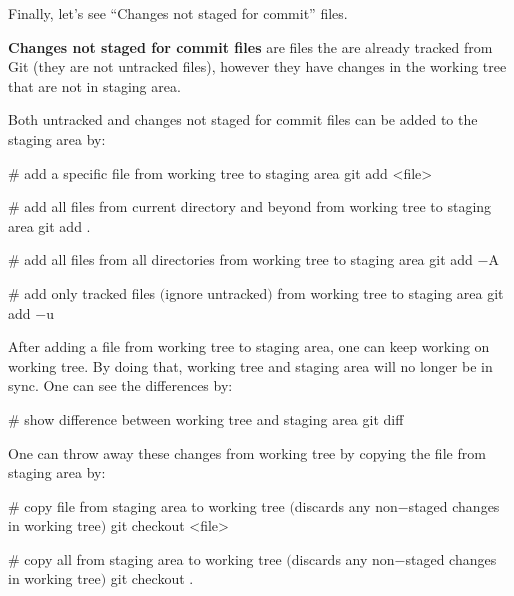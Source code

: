 Finally, let's see ``Changes not staged for commit'' files.

\textbf{Changes not staged for commit files} are files the are already tracked from Git (they are not untracked
files), however they have changes in the working tree that are not in staging area.
\ed

Both untracked and changes not staged for commit files can be added to the staging area by:

\begin{bash}
# add a specific file from working tree to staging area
git add <file>
\end{bash}


\begin{bash}
# add all files from current directory and beyond from working tree to staging area
git add .
\end{bash}

\begin{bash}
# add all files from all directories from working tree to staging area
git add $-$A
\end{bash}

\begin{bash}
# add only tracked files $($ignore untracked$)$ from working tree to staging area
git add $-$u
\end{bash}

After adding a file from working tree to staging area, one can keep working on working tree. By doing that, working
tree and staging area will no longer be in sync. One can see the differences by:

\begin{bash}
# show difference between working tree and staging area
git diff
\end{bash}

One can throw away these changes from working tree by copying the file from staging area by:

\begin{bash}
# copy file from staging area to working tree $($discards any non$-$staged changes in working tree$)$
git checkout <file>
\end{bash}


\begin{bash}
# copy all from staging area to working tree $($discards any non$-$staged changes in working tree$)$
git checkout .
\end{bash}

